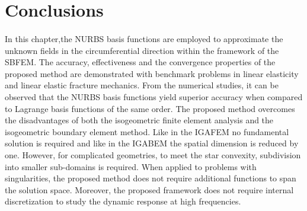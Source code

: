 













\section{Conclusions}
\paragraph{}
In this chapter,the NURBS basis functions are employed to approximate the unknown fields in the circumferential direction within the framework of the SBFEM.
The accuracy, effectiveness and the convergence properties of the proposed method are demonstrated with benchmark problems in linear elasticity and linear elastic fracture mechanics.
From the numerical studies, it can be observed that the NURBS basis functions yield superior accuracy when compared to Lagrange basis functions of the same order.
The proposed method overcomes the disadvantages of both the isogeometric finite element analysis and the isogeometric boundary element method. 
Like in the IGAFEM no fundamental solution is required and like in the IGABEM the spatial dimension is reduced by one.
However, for complicated geometries, to meet the star convexity, subdivision into smaller sub-domains is required.
When applied to problems with singularities, the proposed method does not require additional functions to span the solution space.
Moreover, the proposed framework does not require internal discretization to study the dynamic response at high frequencies.
\pagebreak